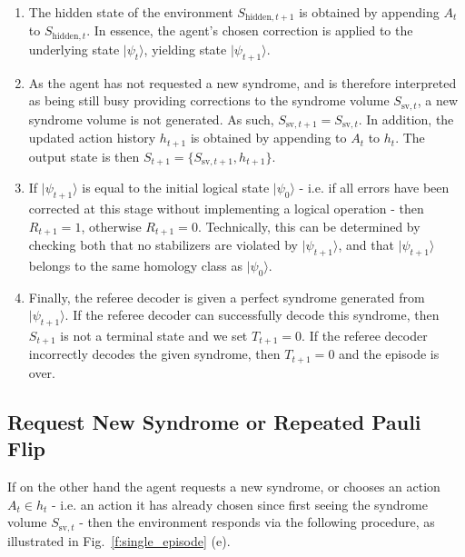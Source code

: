 \documentclass[twocolumn,preprintnumbers,amsmath,amssymb,notitlepage,nofootinbib,longbibliography,superscriptaddress,aps,pra,10pt]{revtex4-1}
\begin{document}
	\begin{enumerate}
		\item The hidden state of the environment $S_{\mathrm{hidden},t+1}$ is obtained by appending $A_t$ to $S_{\mathrm{hidden},t}$. In essence, the agent's chosen correction is applied to the  underlying state $|\psi_t\rangle$, yielding state $|\psi_{t+1}\rangle$.
		\item As the agent has not requested a new syndrome, and is therefore interpreted as being still busy providing corrections to the syndrome volume $S_{\mathrm{sv},t}$, a new syndrome volume is not generated. 
		As such, $S_{\mathrm{sv},t+1} = S_{\mathrm{sv},t}$. 
		In addition, the updated action history $h_{t+1}$ is obtained by appending to $A_t$ to $h_t$.
		The output state is then $S_{t+1} = \{S_{\mathrm{sv},t+1},h_{t+1}\}$.
		\item If $|\psi_{t+1}\rangle$ is equal to the initial logical state $|\psi_0\rangle$ - i.e. if all errors have been corrected at this stage without implementing a logical operation - then $R_{t+1} = 1$, otherwise $R_{t+1} = 0$. Technically, this can be determined by checking both that no stabilizers are violated by $|\psi_{t+1}\rangle$, and that $|\psi_{t+1}\rangle$ belongs to the same homology class as $|\psi_0\rangle$.
		\item Finally, the referee decoder is given a perfect syndrome generated from $|\psi_{t+1}\rangle$. If the referee decoder can successfully decode this syndrome, then $S_{t+1}$ is not a terminal state and we set $T_{t+1} = 0$. If the referee decoder incorrectly decodes the given syndrome, then $T_{t+1} = 0$ and the episode is over.
	\end{enumerate}

	\subsection{Request New Syndrome or Repeated Pauli Flip}

	If on the other hand the agent requests a new syndrome, or chooses an action $A_t \in h_t$ - i.e. an action it has already chosen since first seeing the syndrome volume $S_{\mathrm{sv},t}$ - then the environment responds via the following procedure, as illustrated in Fig.~\ref{f:single_episode} (e).
\end{document}
